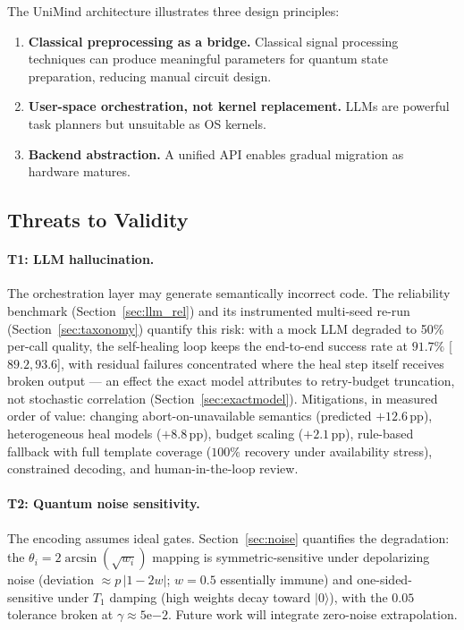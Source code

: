 ﻿\documentclass[12pt,a4paper]{article}
\begin{document}
The UniMind architecture illustrates three design principles:

\begin{enumerate}[leftmargin=2em]
    \item \textbf{Classical preprocessing as a bridge.} Classical signal processing techniques can produce meaningful parameters for quantum state preparation, reducing manual circuit design.
    \item \textbf{User-space orchestration, not kernel replacement.} LLMs are powerful task planners but unsuitable as OS kernels.
    \item \textbf{Backend abstraction.} A unified API enables gradual migration as hardware matures.
\end{enumerate}

\subsection{Threats to Validity}\label{sec:threats}

\paragraph{T1: LLM hallucination.} The orchestration layer may generate semantically incorrect code. The reliability benchmark (Section~\ref{sec:llm_rel}) and its instrumented multi-seed re-run (Section~\ref{sec:taxonomy}) quantify this risk: with a mock LLM degraded to 50\% per-call quality, the self-healing loop keeps the end-to-end success rate at $91.7\%$ [$89.2, 93.6$], with residual failures concentrated where the heal step itself receives broken output --- an effect the exact model attributes to retry-budget truncation, not stochastic correlation (Section~\ref{sec:exactmodel}). Mitigations, in measured order of value: changing abort-on-unavailable semantics (predicted $+12.6$\,pp), heterogeneous heal models ($+8.8$\,pp), budget scaling ($+2.1$\,pp), rule-based fallback with full template coverage ($100\%$ recovery under availability stress), constrained decoding, and human-in-the-loop review.

\paragraph{T2: Quantum noise sensitivity.} The encoding assumes ideal gates. Section~\ref{sec:noise} quantifies the degradation: the $\theta_i = 2\arcsin(\sqrt{w_i})$ mapping is symmetric-sensitive under depolarizing noise (deviation $\approx p\,|1-2w|$; $w=0.5$ essentially immune) and one-sided-sensitive under $T_1$ damping (high weights decay toward $|0\rangle$), with the $0.05$ tolerance broken at $\gamma \approx 5\mathrm{e}{-2}$. Future work will integrate zero-noise extrapolation.
\end{document}
